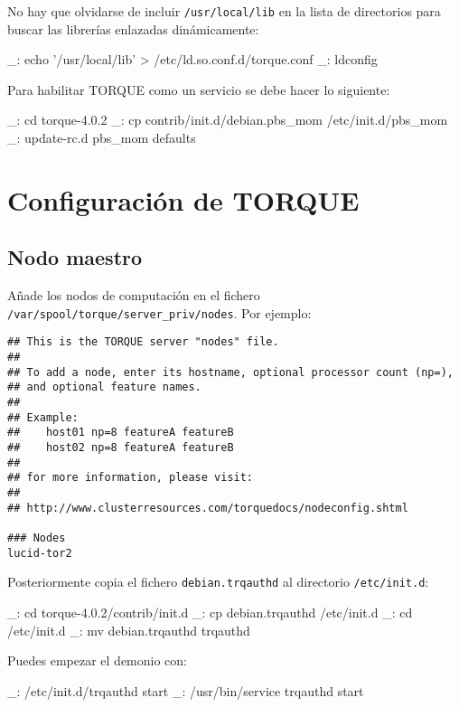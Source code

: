 No hay que olvidarse de incluir \texttt{/usr/local/lib} en la lista de directorios para buscar las librerías enlazadas dinámicamente:

\begin{bashcode}
_: echo '/usr/local/lib' > /etc/ld.so.conf.d/torque.conf
_: ldconfig
\end{bashcode}

Para habilitar TORQUE como un servicio se debe hacer lo siguiente:

\begin{bashcode}
_: cd torque-4.0.2
_: cp contrib/init.d/debian.pbs_mom /etc/init.d/pbs_mom
_: update-rc.d pbs_mom defaults
\end{bashcode}


\section{Configuración de TORQUE}


\subsection{Nodo maestro}
Añade los nodos de computación en el fichero \texttt{/var/spool/torque/server\_priv/nodes}. Por ejemplo:

\begin{lstlisting}
## This is the TORQUE server "nodes" file. 
## 
## To add a node, enter its hostname, optional processor count (np=), 
## and optional feature names.
## 
## Example:
##    host01 np=8 featureA featureB 
##    host02 np=8 featureA featureB
## 
## for more information, please visit:
## 
## http://www.clusterresources.com/torquedocs/nodeconfig.shtml

### Nodes
lucid-tor2
\end{lstlisting}

Posteriormente copia el fichero \texttt{debian.trqauthd} al directorio \texttt{/etc/init.d}:

\begin{bashcode}
_: cd torque-4.0.2/contrib/init.d
_: cp debian.trqauthd /etc/init.d
_: cd /etc/init.d
_: mv debian.trqauthd trqauthd
\end{bashcode}

Puedes empezar el demonio con:

\begin{bashcode}
_: /etc/init.d/trqauthd start
_: /usr/bin/service trqauthd start
\end{bashcode}

